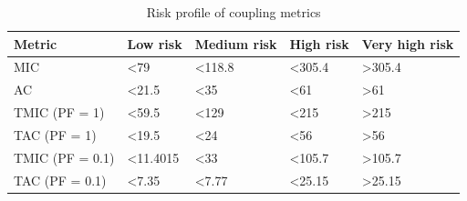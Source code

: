 \begin{table}[ht!]
    \begin{center}
    \begin{tabular}{|l|l|l|l|l|}
    \hline
    Metric & Low risk & Medium risk & High risk & Very high risk \\ \hline
    MIC & \textless 79 & \textless 118.8 & \textless 305.4 & \textgreater 305.4 \\ \hline
    AC & \textless 21.5 & \textless 35 & \textless 61 & \textgreater 61 \\ \hline
    TMIC (PF = 1) & \textless 59.5 & \textless 129 & \textless 215 & \textgreater 215 \\ \hline
    TAC (PF = 1) & \textless 19.5 & \textless 24 & \textless 56 & \textgreater 56 \\ \hline
    TMIC (PF = 0.1) & \textless 11.4015 & \textless 33 & \textless 105.7 & \textgreater 105.7 \\ \hline
    TAC (PF = 0.1) & \textless 7.35 & \textless 7.77 & \textless 25.15 & \textgreater 25.15 \\ \hline
    \end{tabular}
    \end{center}
    \caption{Risk profile of coupling metrics}
    \label{table:risk-profile}
\end{table}
